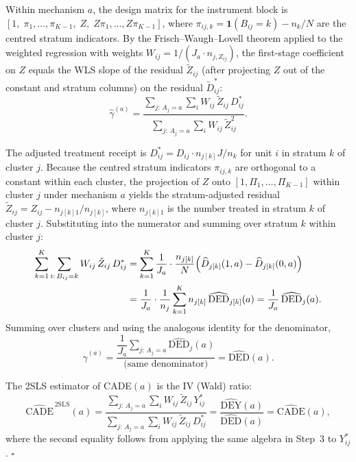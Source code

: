 Within mechanism $a$, the design matrix for the instrument block is
$[1,\; \pi_1,\ldots,\pi_{K-1},\; Z,\; Z\pi_1,\ldots,Z\pi_{K-1}]$,
where $\pi_{ij,k} = \mathbf{1}(B_{ij}=k) - n_k/N$ are the centred stratum indicators.
By the Frisch--Waugh--Lovell theorem applied to the weighted regression with weights
$W_{ij} = 1/(J_a \cdot n_{j,Z_{ij}})$, the first-stage coefficient on $Z$ equals the
WLS slope of the residual $\tilde{Z}_{ij}$ (after projecting $Z$ out of the constant and
stratum columns) on the residual $\widetilde{D}^*_{ij}$:
$$
\hat{\gamma}^{(a)} = \frac{\displaystyle\sum_{j:\,A_j=a}\sum_{i} W_{ij}\,\tilde{Z}_{ij}\,D^*_{ij}}
                          {\displaystyle\sum_{j:\,A_j=a}\sum_{i} W_{ij}\,\tilde{Z}_{ij}^2}.
$$


The adjusted treatment receipt is $D^*_{ij} = D_{ij}\cdot n_{j[k]}J/n_k$ for unit $i$
in stratum $k$ of cluster $j$.
Because the centred stratum indicators $\pi_{ij,k}$ are orthogonal to a constant within
each cluster, the projection of $Z$ onto $[1, \Pi_1,\ldots,\Pi_{K-1}]$ within cluster $j$
under mechanism $a$ yields the stratum-adjusted residual
$\tilde{Z}_{ij} = Z_{ij} - n_{j[k]1}/n_{j[k]}$,
where $n_{j[k]1}$ is the number treated in stratum $k$ of cluster $j$.
Substituting into the numerator and summing over stratum $k$ within cluster $j$:
\begin{align*}
\sum_{k=1}^K\sum_{i:\,B_{ij}=k} W_{ij}\,\tilde{Z}_{ij}\,D^*_{ij}
&= \sum_{k=1}^K \frac{1}{J_a}\cdot\frac{n_{j[k]}}{N}
   \Bigl(\widehat{D}_{j[k]}(1,a) - \widehat{D}_{j[k]}(0,a)\Bigr)\\
&= \frac{1}{J_a}\cdot\frac{1}{n_j}\sum_{k=1}^K n_{j[k]}\,\widehat{\mathrm{DED}}_{j[k]}(a)
 = \frac{1}{J_a}\,\widehat{\mathrm{DED}}_j(a).
\end{align*}
Summing over clusters and using the analogous identity for the denominator,
$$
\hat{\gamma}^{(a)} = \frac{\dfrac{1}{J_a}\displaystyle\sum_{j:\,A_j=a}\widehat{\mathrm{DED}}_j(a)}
                          {\text{(same denominator)}}
= \widehat{\mathrm{DED}}(a).
$$


The 2SLS estimator of CADE$(a)$ is the IV (Wald) ratio:
$$
\widehat{\mathrm{CADE}}^{\,\mathrm{2SLS}}(a)
= \frac{\displaystyle\sum_{j:\,A_j=a}\sum_{i} W_{ij}\,\tilde{Z}_{ij}\,Y^*_{ij}}
       {\displaystyle\sum_{j:\,A_j=a}\sum_{i} W_{ij}\,\tilde{Z}_{ij}\,D^*_{ij}}
= \frac{\widehat{\mathrm{DEY}}(a)}{\widehat{\mathrm{DED}}(a)}
= \widehat{\mathrm{CADE}}(a),
$$
where the second equality follows from applying the same algebra in Step~3 to $Y^*_{ij}$.
\hfill$\square$
